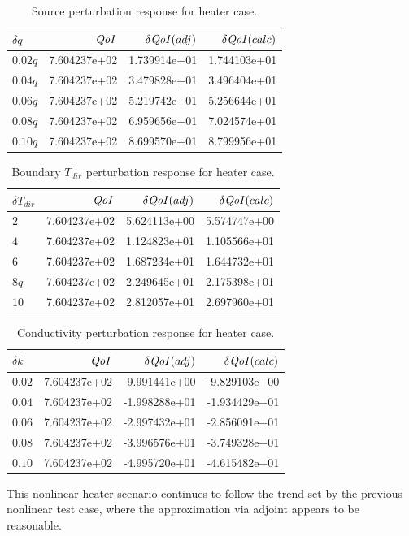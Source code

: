 \documentclass{article}
\newcommand{\qoi}{{\it QoI}\xspace}
\newcommand{\Tdir}{T_{dir}}
\begin{document}
\begin{table}[H]
\centering
  \begin{tabular}{| l | r | r | r |}
    \hline
    $\delta q$ & $\qoi$ & $\delta \qoi (adj)$ & $\delta \qoi (calc)$ \\ \hline
    $0.02q$ & 7.604237e+02 &   1.739914e+01 & 1.744103e+01  \\ \hline
    $0.04q$ & 7.604237e+02 &  3.479828e+01 & 3.496404e+01 \\ \hline
    $0.06q$ & 7.604237e+02 &  5.219742e+01 & 5.256644e+01  \\ \hline
    $0.08q$ & 7.604237e+02 &  6.959656e+01 & 7.024574e+01  \\ \hline
    $0.10q$ & 7.604237e+02 &  8.699570e+01 & 8.799956e+01  \\ \hline
    \end{tabular}
  \caption{Source perturbation response for heater case.}
\end{table}

\begin{table}[H]
\centering
  \begin{tabular}{| l | r | r | r |}
    \hline
    $\delta \Tdir$ & $\qoi$ & $\delta \qoi (adj)$ & $\delta \qoi (calc)$ \\ \hline
    $2$ & 7.604237e+02 &  5.624113e+00  &  5.574747e+00   \\ \hline
    $4$ & 7.604237e+02 &  1.124823e+01 &  1.105566e+01   \\ \hline
    $6$ & 7.604237e+02 &  1.687234e+01 &  1.644732e+01   \\ \hline
    $8q$ & 7.604237e+02 & 2.249645e+01 & 2.175398e+01   \\ \hline
    $10$ & 7.604237e+02 & 2.812057e+01  & 2.697960e+01   \\ \hline
    \end{tabular}
  \caption{Boundary $\Tdir$ perturbation response for heater case.}
\end{table}

\begin{table}[H]
\centering
  \begin{tabular}{| l | r | r | r |}
    \hline
    $\delta k$ & $\qoi$ & $\delta \qoi (adj)$ & $\delta \qoi (calc)$ \\ \hline
    $0.02$ & 7.604237e+02 & -9.991441e+00 &  -9.829103e+00  \\ \hline
    $0.04$ & 7.604237e+02 & -1.998288e+01 &  -1.934429e+01  \\ \hline
    $0.06$ & 7.604237e+02 & -2.997432e+01 &  -2.856091e+01  \\ \hline
    $0.08$ & 7.604237e+02 & -3.996576e+01 &  -3.749328e+01 \\ \hline
    $0.10$ & 7.604237e+02 & -4.995720e+01 &  -4.615482e+01  \\ \hline
    \end{tabular}
  \caption{Conductivity perturbation response for heater case.}
\end{table}
This nonlinear heater scenario continues to follow the trend set by the previous nonlinear test case, where the approximation via adjoint appears to be reasonable. 
\end{document}
